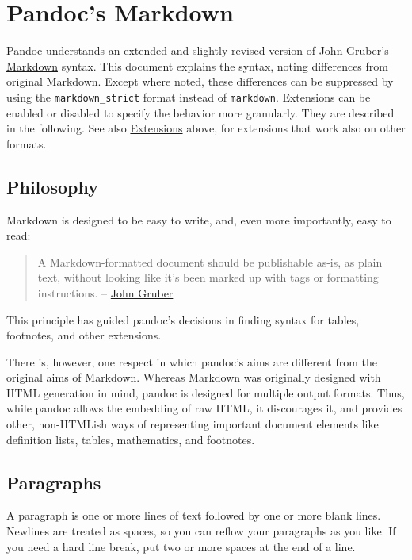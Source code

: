 \hypertarget{pandocs-markdown}{%
\section{Pandoc's Markdown}\label{pandocs-markdown}}

Pandoc understands an extended and slightly revised version of John
Gruber's \href{https://daringfireball.net/projects/markdown/}{Markdown}
syntax. This document explains the syntax, noting differences from
original Markdown. Except where noted, these differences can be
suppressed by using the \texttt{markdown\_strict} format instead of
\texttt{markdown}. Extensions can be enabled or disabled to specify the
behavior more granularly. They are described in the following. See also
\protect\hyperlink{extensions}{Extensions} above, for extensions that
work also on other formats.

\hypertarget{philosophy}{%
\subsection{Philosophy}\label{philosophy}}

Markdown is designed to be easy to write, and, even more importantly,
easy to read:

\begin{quote}
A Markdown-formatted document should be publishable as-is, as plain
text, without looking like it's been marked up with tags or formatting
instructions. --
\href{https://daringfireball.net/projects/markdown/syntax\#philosophy}{John
Gruber}
\end{quote}

This principle has guided pandoc's decisions in finding syntax for
tables, footnotes, and other extensions.

There is, however, one respect in which pandoc's aims are different from
the original aims of Markdown. Whereas Markdown was originally designed
with HTML generation in mind, pandoc is designed for multiple output
formats. Thus, while pandoc allows the embedding of raw HTML, it
discourages it, and provides other, non-HTMLish ways of representing
important document elements like definition lists, tables, mathematics,
and footnotes.

\hypertarget{paragraphs}{%
\subsection{Paragraphs}\label{paragraphs}}

A paragraph is one or more lines of text followed by one or more blank
lines. Newlines are treated as spaces, so you can reflow your paragraphs
as you like. If you need a hard line break, put two or more spaces at
the end of a line.

